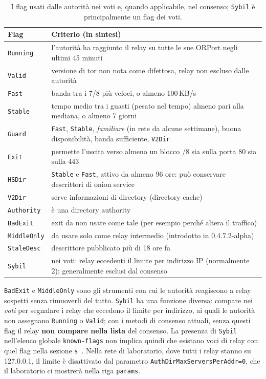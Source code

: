 \begin{table}[htbp]
\centering\small
\begin{tabularx}{\textwidth}{@{}l>{\raggedright\arraybackslash}X@{}}
\toprule
Flag & Criterio (in sintesi) \\
\midrule
\texttt{Running} & l'autorità ha raggiunto il relay su tutte le sue ORPort negli ultimi 45 minuti \\
\texttt{Valid} & versione di tor non nota come difettosa, relay non escluso dalle autorità \\
\texttt{Fast} & banda tra i 7/8 più veloci, o almeno 100\,KB/s \\
\texttt{Stable} & tempo medio tra i guasti (pesato nel tempo) almeno pari alla mediana, o almeno 7 giorni \\
\texttt{Guard} & \texttt{Fast}, \texttt{Stable}, \emph{familiare} (in rete da alcune settimane), buona disponibilità, banda sufficiente, \texttt{V2Dir} \\
\texttt{Exit} & permette l'uscita verso almeno un blocco /8 sia sulla porta 80 sia sulla 443 \\
\texttt{HSDir} & \texttt{Stable} e \texttt{Fast}, attivo da almeno 96 ore: può conservare descrittori di onion service \\
\texttt{V2Dir} & serve informazioni di directory (directory cache) \\
\texttt{Authority} & è una directory authority \\
\texttt{BadExit} & exit da non usare come tale (per esempio perché altera il traffico) \\
\texttt{MiddleOnly} & da usare solo come relay intermedio (introdotto in 0.4.7.2-alpha) \\
\texttt{StaleDesc} & descrittore pubblicato più di 18 ore fa \\
\texttt{Sybil} & nei voti: relay eccedenti il limite per indirizzo IP (normalmente 2); generalmente esclusi dal consenso \\
\bottomrule
\end{tabularx}
\caption{I flag usati dalle autorità nei voti e, quando applicabile, nel consenso; \texttt{Sybil} è principalmente un flag dei voti.}
\label{tab:flag}
\end{table}

\texttt{BadExit} e \texttt{MiddleOnly} sono gli strumenti con cui le autorità reagiscono a relay sospetti senza rimuoverli del tutto. \texttt{Sybil} ha una funzione diversa: compare nei \emph{voti} per segnalare i relay che eccedono il limite per indirizzo, ai quali le autorità non assegnano \texttt{Running} o \texttt{Valid}; con i metodi di consenso attuali, senza questi flag il relay \textbf{non compare nella lista} del consenso. La presenza di \texttt{Sybil} nell'elenco globale \texttt{known-flags} non implica quindi che esistano voci di relay con quel flag nella sezione \texttt{s}~. Nella rete di laboratorio, dove tutti i relay stanno su 127.0.0.1, il limite è disattivato dal parametro \texttt{AuthDirMaxServersPerAddr=0}, che il laboratorio ci mostrerà nella riga \texttt{params}.

